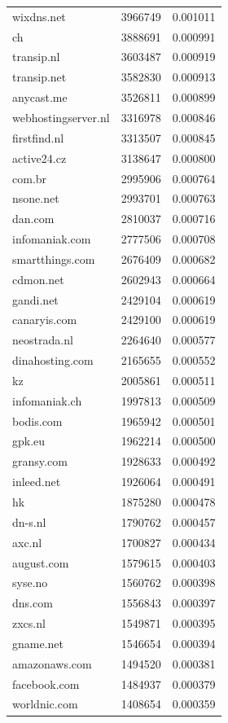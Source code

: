 \begin{tabular}{lrr}
wixdns.net & 3966749 & 0.001011 \\
ch & 3888691 & 0.000991 \\
transip.nl & 3603487 & 0.000919 \\
transip.net & 3582830 & 0.000913 \\
anycast.me & 3526811 & 0.000899 \\
webhostingserver.nl & 3316978 & 0.000846 \\
firstfind.nl & 3313507 & 0.000845 \\
active24.cz & 3138647 & 0.000800 \\
com.br & 2995906 & 0.000764 \\
nsone.net & 2993701 & 0.000763 \\
dan.com & 2810037 & 0.000716 \\
infomaniak.com & 2777506 & 0.000708 \\
smartthings.com & 2676409 & 0.000682 \\
cdmon.net & 2602943 & 0.000664 \\
gandi.net & 2429104 & 0.000619 \\
canaryis.com & 2429100 & 0.000619 \\
neostrada.nl & 2264640 & 0.000577 \\
dinahosting.com & 2165655 & 0.000552 \\
kz & 2005861 & 0.000511 \\
infomaniak.ch & 1997813 & 0.000509 \\
bodis.com & 1965942 & 0.000501 \\
gpk.eu & 1962214 & 0.000500 \\
gransy.com & 1928633 & 0.000492 \\
inleed.net & 1926064 & 0.000491 \\
hk & 1875280 & 0.000478 \\
dn-s.nl & 1790762 & 0.000457 \\
axc.nl & 1700827 & 0.000434 \\
august.com & 1579615 & 0.000403 \\
syse.no & 1560762 & 0.000398 \\
dns.com & 1556843 & 0.000397 \\
zxcs.nl & 1549871 & 0.000395 \\
gname.net & 1546654 & 0.000394 \\
amazonaws.com & 1494520 & 0.000381 \\
facebook.com & 1484937 & 0.000379 \\
worldnic.com & 1408654 & 0.000359 \\

\end{tabular}
